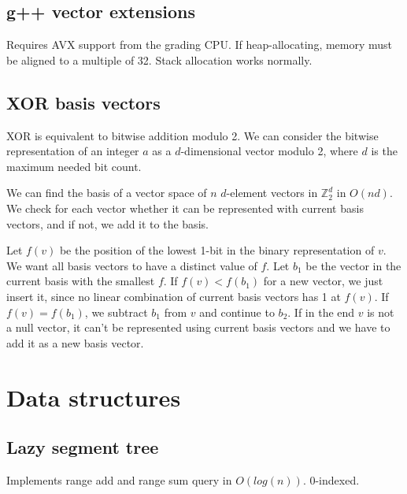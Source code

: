\documentclass{article}
\begin{document}
\subsection {g++ vector extensions}

Requires AVX support from the grading CPU. If heap-allocating, memory must be aligned to a multiple of 32. Stack allocation works normally.



\subsection {XOR basis vectors}

XOR is equivalent to bitwise addition modulo 2. We can consider the bitwise representation of an integer $a$ as a $d$-dimensional vector modulo 2, where $d$ is the maximum needed bit count.

We can find the basis of a vector space of $n$ $d$-element vectors in $\mathbb{Z}_2^d$ in $O(nd)$. We check for each vector whether it can be represented with current basis vectors, and if not, we add it to the basis.

Let $f(v)$ be the position of the lowest 1-bit in the binary representation of $v$. We want all basis vectors to have a distinct value of $f$. Let $b_1$ be the vector in the current basis with the smallest $f$. If $f(v) < f(b_1)$ for a new vector, we just insert it, since no linear combination of current basis vectors has 1 at $f(v)$. If $f(v) = f(b_1)$, we subtract $b_1$ from $v$ and continue to $b_2$. If in the end $v$ is not a null vector, it can't be represented using current basis vectors and we have to add it as a new basis vector.



\section{Data structures}

\subsection{Lazy segment tree}

Implements range add and range sum query in $O(log(n))$. $0$-indexed.


\end{document}
